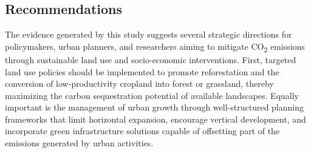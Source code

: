 \documentclass[10pt,letterpaper]{article}
\begin{document}
%

\subsection{Recommendations}

The evidence generated by this study suggests several strategic directions for policymakers, urban planners, and researchers aiming to mitigate CO\textsubscript{2} emissions through sustainable land use and socio-economic interventions. First, targeted land use policies should be implemented to promote reforestation and the conversion of low-productivity cropland into forest or grassland, thereby maximizing the carbon sequestration potential of available landscapes. Equally important is the management of urban growth through well-structured planning frameworks that limit horizontal expansion, encourage vertical development, and incorporate green infrastructure solutions capable of offsetting part of the emissions generated by urban activities.
\end{document}
